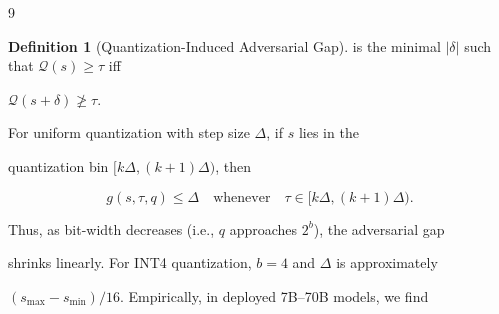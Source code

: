 \documentclass[11pt]{article}
\theoremstyle{definition}
\newtheorem{definition}[theorem]{Definition}
\begin{document}
\begin{thebibliography}{9}
\begin{definition}[Quantization-Induced Adversarial Gap]
is the minimal $| \delta |$ such that $\mathcal{Q}(s) \geq \tau$ iff






$\mathcal{Q}(s + \delta) \ngeq \tau$.






\end{definition}













\begin{property}






For uniform quantization with step size $\Delta$, if $s$ lies in the






quantization bin $[k\Delta, (k+1)\Delta)$, then






\[






g(s, \tau, q) \leq \Delta \quad \text{whenever} \quad \tau \in [k\Delta, (k+1)\Delta).






\]






\end{property}













Thus, as bit-width decreases (i.e., $q$ approaches $2^b$), the adversarial gap






shrinks linearly.  For INT4 quantization, $b=4$ and $\Delta$ is approximately






$(s_{\max} - s_{\min}) / 16$.  Empirically, in deployed 7B--70B models, we find







\end{thebibliography}
\end{document}
